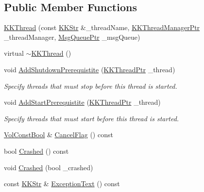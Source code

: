 \subsection*{Public Member Functions}
\begin{DoxyCompactItemize}
\item 
\hyperlink{class_k_k_b_1_1_k_k_thread_aae2cc3ddbc461d7be2ff904b40ccf2e8}{K\+K\+Thread} (const \hyperlink{class_k_k_b_1_1_k_k_str}{K\+K\+Str} \&\+\_\+thread\+Name, \hyperlink{namespace_k_k_b_a9373d6bd6f2977b14e92c9e8e5ec4cdc}{K\+K\+Thread\+Manager\+Ptr} \+\_\+thread\+Manager, \hyperlink{namespace_k_k_b_aaa43074273f12ed325a053d9e1faf84a}{Msg\+Queue\+Ptr} \+\_\+msg\+Queue)
\item 
virtual \hyperlink{class_k_k_b_1_1_k_k_thread_afb0fecef6c388894ce1c6e6926f3b177}{$\sim$\+K\+K\+Thread} ()
\item 
void \hyperlink{class_k_k_b_1_1_k_k_thread_aace756a5a4ea776957f8be561ff8bd16}{Add\+Shutdown\+Prerequistite} (\hyperlink{class_k_k_b_1_1_k_k_thread_ae0ca65f275a57c346e71486ad84b271a}{K\+K\+Thread\+Ptr} \+\_\+thread)
\begin{DoxyCompactList}\small\item\em Specify threads that must stop before this thread is started. \end{DoxyCompactList}\item 
void \hyperlink{class_k_k_b_1_1_k_k_thread_a092fff07582fdaa4b17eb00214d47923}{Add\+Start\+Prerequistite} (\hyperlink{class_k_k_b_1_1_k_k_thread_ae0ca65f275a57c346e71486ad84b271a}{K\+K\+Thread\+Ptr} \+\_\+thread)
\begin{DoxyCompactList}\small\item\em Specify threads that must start before this thread is started. \end{DoxyCompactList}\item 
\hyperlink{namespace_k_k_b_a7d390f568e2831fb76b86b56c87bf92f}{Vol\+Const\+Bool} \& \hyperlink{class_k_k_b_1_1_k_k_thread_a85dcfd92879c8f74102af810cc44628b}{Cancel\+Flag} () const 
\item 
bool \hyperlink{class_k_k_b_1_1_k_k_thread_a1cc302487fe9e7fe79e7e6b056d3e7d1}{Crashed} () const 
\item 
void \hyperlink{class_k_k_b_1_1_k_k_thread_a56f7600f8a53e737dd8f6732a1176a91}{Crashed} (bool \+\_\+crashed)
\item 
const \hyperlink{class_k_k_b_1_1_k_k_str}{K\+K\+Str} \& \hyperlink{class_k_k_b_1_1_k_k_thread_a28ce636186cfdc8914248e0a087d7b0d}{Exception\+Text} () const 
\item 

\end{DoxyCompactItemize}
